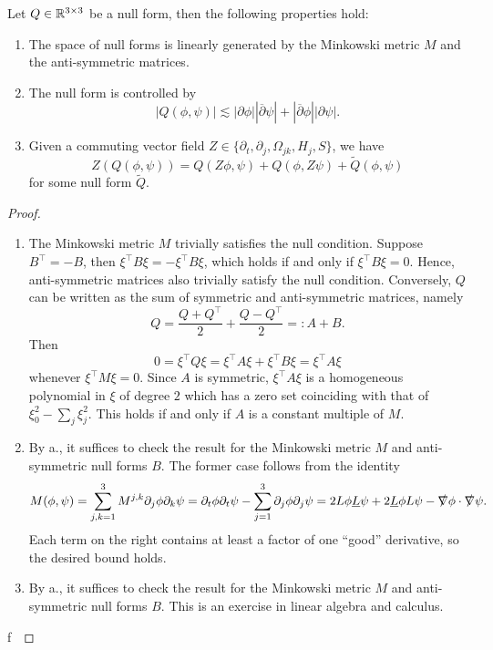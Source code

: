 \begin{lemma}
	Let $Q \in \mathbb R^{3 \times 3}$ be a null form, then the following properties hold:
	\begin{enumerate}
		\item The space of null forms is linearly generated by the Minkowski metric $M$ and the anti-symmetric matrices. 
	
		\item The null form is controlled by
					\[ |Q( \phi,  \psi)| \lesssim |\partial \phi| |\overline\partial \psi| + |\overline\partial \phi| |\partial \psi|.\]
		\item Given a commuting vector field $Z \in \{ \partial_t, \partial_j, \Omega_{jk}, H_j,  S \}$, we have
						\[ Z(Q( \phi,\psi)) = Q(Z\phi, \psi) + Q(\phi, Z \psi) + \tilde Q(\phi, \psi) \]
					for some null form $\tilde Q$. 	
	\end{enumerate}
\end{lemma}

\begin{proof}
\leavevmode
\begin{enumerate}
	\item The Minkowski metric $M$ trivially satisfies the null condition. Suppose $B^\top = - B$, then $\xi^\top B \xi = - \xi^\top B \xi$, which holds if and only if $\xi^\top B \xi = 0$. Hence, anti-symmetric matrices also trivially satisfy the null condition. Conversely, $Q$ can be written as the sum of symmetric and anti-symmetric matrices, namely
				\[ Q = \frac{Q + Q^\top}{2} + \frac{Q - Q^\top}{2} =: A + B. \]
			Then
				\[ 0 =  \xi^\top Q \xi = \xi^\top A \xi + \xi^\top B \xi = \xi^\top A \xi\]
	whenever $\xi^\top M \xi = 0$. Since $A$ is symmetric, $\xi^\top A \xi$ is a homogeneous polynomial in $\xi$ of degree $2$ which has a zero set coinciding with that of $\xi_0^2 - \sum_j \xi_j^2$. This holds if and only if $A$ is a constant multiple of $M$. 

	\item By a., it suffices to check the result for the Minkowski metric $M$ and anti-symmetric null forms $B$. The former case follows from the identity
					\[ M(\phi, \psi) = \sum_{j, k = 1}^3 M^{j, k} \partial_j \phi \partial_k \psi = \partial_t \phi \partial_t \psi - \sum_{j = 1}^3 \partial_j \phi \partial_j \psi = 2L \phi \underline L \psi + 2 \underline L \phi L \psi - \slashed \nabla \phi \cdot \slashed \nabla \psi. \]
				Each term on the right contains at least a factor of one ``good'' derivative, so the desired bound holds. 
	\item By a., it suffices to check the result for the Minkowski metric $M$ and anti-symmetric null forms $B$. This is an exercise in linear algebra and calculus. 
\end{enumerate}f\
\end{proof}

